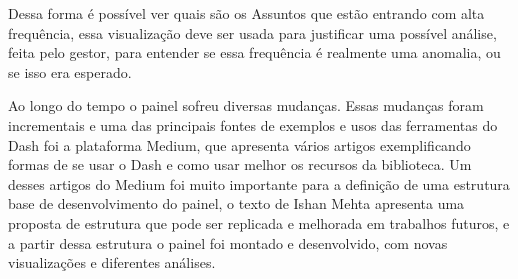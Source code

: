 Dessa forma é possível ver quais são os Assuntos que estão entrando com alta frequência, essa visualização deve ser usada para justificar uma possível análise, feita pelo gestor, para entender se essa frequência é realmente uma anomalia, ou se isso era esperado.

Ao longo do tempo o painel sofreu diversas mudanças. Essas mudanças foram incrementais e uma das principais fontes de exemplos e usos das ferramentas do Dash foi a plataforma Medium, que apresenta vários artigos exemplificando formas de se usar o Dash e como usar melhor os recursos da biblioteca. Um desses artigos do Medium foi muito importante para a definição de uma estrutura base de desenvolvimento do painel, o texto de Ishan Mehta \cite{medium1} apresenta uma proposta de estrutura que pode ser replicada e melhorada em trabalhos futuros, e a partir dessa estrutura o painel foi montado e desenvolvido, com novas visualizações e diferentes análises.

